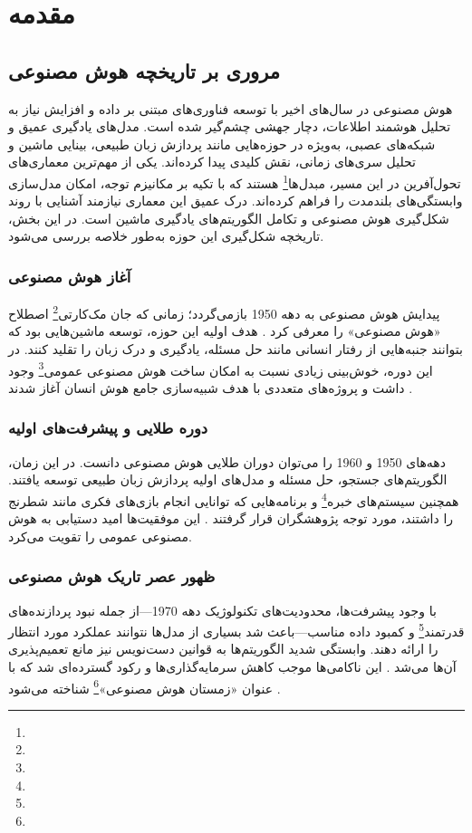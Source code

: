 \chapter{مقدمه}

\section{مروری بر تاریخچه هوش مصنوعی}

هوش مصنوعی در سال‌های اخیر با توسعه فناوری‌های مبتنی بر داده و افزایش نیاز به تحلیل هوشمند اطلاعات، دچار جهشی چشم‌گیر شده است. مدل‌های یادگیری عمیق و شبکه‌های عصبی، به‌ویژه در حوزه‌هایی مانند پردازش زبان طبیعی، بینایی ماشین و تحلیل سری‌های زمانی، نقش کلیدی پیدا کرده‌اند. یکی از مهم‌ترین معماری‌های تحول‌آفرین در این مسیر، مبدل‌ها\footnote{} هستند که با تکیه بر مکانیزم توجه، امکان مدل‌سازی وابستگی‌های بلندمدت را فراهم کرده‌اند. درک عمیق این معماری نیازمند آشنایی با روند شکل‌گیری هوش مصنوعی و تکامل الگوریتم‌های یادگیری ماشین است. در این بخش، تاریخچه شکل‌گیری این حوزه به‌طور خلاصه بررسی می‌شود.

\subsection{آغاز هوش مصنوعی}
پیدایش هوش مصنوعی به دهه 1950 بازمی‌گردد؛ زمانی که جان مک‌کارتی\footnote{} اصطلاح «هوش مصنوعی» را معرفی کرد \cite{mccarthy1956proposal}. هدف اولیه این حوزه، توسعه ماشین‌هایی بود که بتوانند جنبه‌هایی از رفتار انسانی مانند حل مسئله، یادگیری و درک زبان را تقلید کنند. در این دوره، خوش‌بینی زیادی نسبت به امکان ساخت هوش مصنوعی عمومی\footnote{} وجود داشت و پروژه‌های متعددی با هدف شبیه‌سازی جامع هوش انسان آغاز شدند \cite{crevier1993ai,nilsson2010quest}.

\subsection{دوره طلایی و پیشرفت‌های اولیه}
دهه‌های 1950 و 1960 را می‌توان دوران طلایی هوش مصنوعی دانست. در این زمان، الگوریتم‌های جستجو، حل مسئله و مدل‌های اولیه پردازش زبان طبیعی توسعه یافتند. همچنین سیستم‌های خبره\footnote{} و برنامه‌هایی که توانایی انجام بازی‌های فکری مانند شطرنج را داشتند، مورد توجه پژوهشگران قرار گرفتند \cite{newell1959report,feigenbaum1983handbook}. این موفقیت‌ها امید دستیابی به هوش مصنوعی عمومی را تقویت می‌کرد.

\subsection{ظهور عصر تاریک هوش مصنوعی}
با وجود پیشرفت‌ها، محدودیت‌های تکنولوژیک دهه 1970—از جمله نبود پردازنده‌های قدرتمند\footnote{} و کمبود داده مناسب—باعث شد بسیاری از مدل‌ها نتوانند عملکرد مورد انتظار را ارائه دهند. وابستگی شدید الگوریتم‌ها به قوانین دست‌نویس نیز مانع تعمیم‌پذیری آن‌ها می‌شد \cite{russell2016artificial}. این ناکامی‌ها موجب کاهش سرمایه‌گذاری‌ها و رکود گسترده‌ای شد که با عنوان «زمستان هوش مصنوعی»\footnote{} شناخته می‌شود \cite{lighthill1973artificial,crevier1993ai}.

